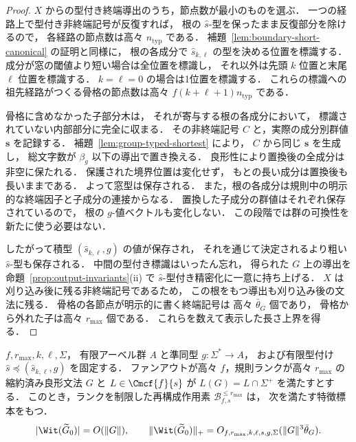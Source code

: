 \begin{proof}
$X$ からの型付き終端導出のうち，節点数が最小のものを選ぶ．
一つの経路上で型付き非終端記号が反復すれば，
根の $\widehat{s}$-型を保ったまま反復部分を除けるので，
各経路の節点数は高々 $n_{\mathrm{typ}}$ である．
補題~\ref{lem:boundary-short-canonical} の証明と同様に，
根の各成分で $\widehat{s}_{k,\ell}$ の型を決める位置を標識する．
成分が窓の閾値より短い場合は全位置を標識し，
それ以外は先頭 $k$ 位置と末尾 $\ell$ 位置を標識する．
$k=\ell=0$ の場合は1位置を標識する．
これらの標識への祖先経路がつくる骨格の節点数は高々
$f(k+\ell+1)n_{\mathrm{typ}}$ である．

骨格に含めなかった子部分木は，
それが寄与する根の各成分において，
標識されていない内部部分に完全に収まる．
その非終端記号 $C$ と，実際の成分別群値
$\mathbf s$ を記録する．
補題~\ref{lem:group-typed-shortest} により，
$C$ から同じ $\mathbf s$ を生成し，
総文字数が $\beta_g$ 以下の導出で置き換える．
良形性により置換後の全成分は非空に保たれる．
保護された境界位置は変化せず，
もとの長い成分は置換後も長いままである．
よって窓型は保存される．
また，根の各成分は規則中の明示的な終端因子と子成分の連接からなる．
置換した子成分の群値はそれぞれ保存されているので，
根の $g$-値ベクトルも変化しない．
この段階では群の可換性を新たに使う必要はない．

したがって積型 $(\widehat{s}_{k,\ell},g)$ の値が保存され，
それを通じて決定されるより粗い $\widehat{s}$-型も保存される．
中間の型付き標識はいったん忘れ，
得られた $G$ 上の導出を
命題~\ref{prop:output-invariants}(ii) で
$\widehat{s}$-型付き精密化に一意に持ち上げる．
$X$ は刈り込み後に残る非終端記号であるため，
この根をもつ導出も刈り込み後の文法に残る．
骨格の各節点が明示的に書く終端記号は
高々 $\bar\theta_G$ 個であり，
骨格から外れた子は高々 $r_{\max}$ 個である．
これらを数えて表示した長さ上界を得る．
\end{proof}

\begin{theorem}[窓・アーベル群型付けに対する多項式特徴データ]
\label{thm:window-abelian-polydata}
$f,r_{\max},k,\ell,\Sigma$，
有限アーベル群 $A$ と準同型 $g:\Sigma^*\to A$，
および有限型付け $\widehat{s}\preceq(\widehat{s}_{k,\ell},g)$ を固定する．
ファンアウトが高々 $f$，規則ランクが高々 $r_{\max}$ の
縮約済み良形文法 $G$ と $L\in\Cmcf{f}{s}$ が
$L(G)=L\cap\Sigma^+$ を満たすとする．
このとき，ランクを制限した再構成作用素
$\mathcal B^{\le r_{\max}}_{f,s}$ は，
次を満たす特徴標本をもつ．
\[
 |\Wit(\widetilde G_0)|=O(\|G\|),\qquad
 \|\Wit(\widetilde G_0)\|_+
   =O_{f,r_{\max},k,\ell,s,g,\Sigma}
     (\|G\|^3\bar\theta_G).
\]
\end{theorem}

